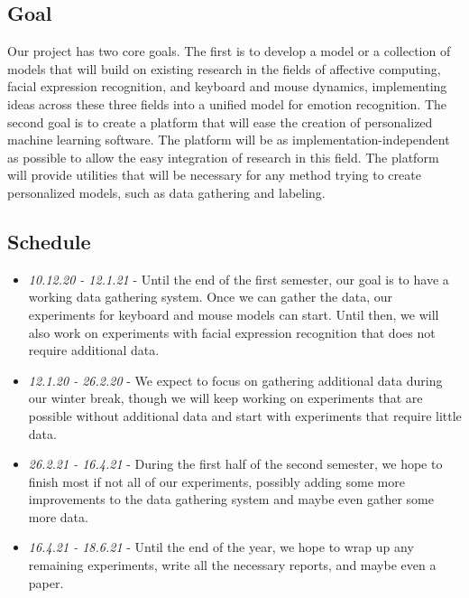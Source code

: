 \documentclass[../main.tex]{subfiles}
\begin{document}
\subsection{Goal}
Our project has two core goals. The first is to develop a model or a collection of models that will build on existing research in
the fields of affective computing, facial expression recognition, and keyboard and mouse dynamics, implementing ideas across these
three fields into a unified model for emotion recognition.
The second goal is to create a platform that will ease the creation of personalized machine learning software.
The platform will be as implementation-independent as possible to allow the easy integration of research in this field.
The platform will provide utilities that will be necessary for any method trying to create personalized models,
such as data gathering and labeling.


\subsection{Schedule}

\begin{samepage}
\begin{itemize}
    \item \emph{10.12.20 - 12.1.21} - Until the end of the first semester, our goal is to have a working data gathering system.
        Once we can gather the data, our experiments for keyboard and mouse models can start. Until then,
        we will also work on experiments with facial expression recognition that does not require additional data. 
    \item \emph{12.1.20 - 26.2.20} - We expect to focus on gathering additional data during our winter break,
        though we will keep working on experiments that are possible without additional data and start with experiments that require
        little data.
    \item \emph{26.2.21 - 16.4.21} - During the first half of the second semester, we hope to finish most if not all of our experiments,
        possibly adding some more improvements to the data gathering system and maybe even gather some more data. 
    \item \emph{16.4.21 - 18.6.21} - Until the end of the year, we hope to wrap up any remaining experiments, write all the necessary reports,
        and maybe even a paper.
\end{itemize}
\end{samepage}
\end{document}
